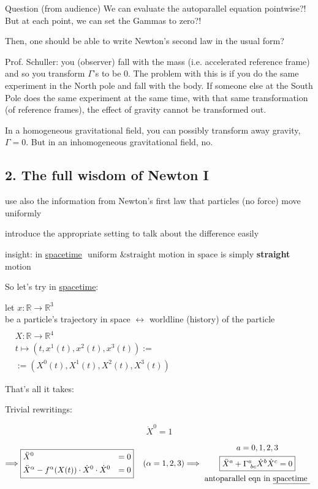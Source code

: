 	Question (from audience) We can evaluate the autoparallel equation pointwise?! But at each point, we can set the Gammas to zero?!
	
	Then, one should be able to write Newton's second law in the usual form?
	
	Prof. Schuller: you (observer) fall with the mass (i.e. accelerated reference frame) and so you transform $\Gamma$'s to be $0$.  The problem with this is if you do the same experiment in the North pole and fall with the body.  If someone else at the South Pole does the same experiment at the same time, with that same transformation (of reference frames), the effect of gravity cannot be transformed out.
	
	In a homogeneous gravitational field, you can possibly transform away gravity, $\Gamma=0$.  But in an inhomogeneous gravitational field, no.
	
	\subsection*{2. The full wisdom of Newton I}
	
	use also the information from Newton's first law that particles (no force) move uniformly 
	
	introduce the appropriate setting to talk about the difference easily
	
	insight: in \underline{spacetime} $\boxed{ \text{ uniform \& straight motion in space}}$ is simply \textbf{straight} motion
	
	So let's try in \underline{spacetime}: 
	
	let $x: \mathbb{R} \to \mathbb{R}^3$ \\
	\phantom{\quad } be a particle's trajectory in space $\longleftrightarrow $ worldline (history) of the particle $\begin{aligned} & \quad \\
	& X : \mathbb{R} \to \mathbb{R}^4  \\
	& t\mapsto (t, x^1(t), x^2(t),x^3(t)) := \\
	& := (X^0(t), X^1(t),X^2(t),X^3(t)) \end{aligned}$
	
	That's all it takes:
	
	Trivial rewritings:
	
	\[
	\dot{X}^0 =1
	\]
	
	\[
	\Longrightarrow \boxed{ \begin{aligned}
		& \ddot{X}^0 & = 0 \\ 
		& \ddot{X}^{\alpha} - f^{\alpha}(X(t))\cdot \dot{X}^0 \cdot \dot{X}^0 & =0 
		\end{aligned} } \quad \, (\alpha = 1,2,3)  \Longrightarrow \begin{gathered}
	a = 0,1,2,3 \\
	\boxed{ \ddot{X}^a + \Gamma^a_{ \, \, bc}\dot{X}^b \dot{X}^c = 0 } \\
	\text{ antoparallel eqn in \underline{spacetime } }
	\end{gathered}
	\]
	
